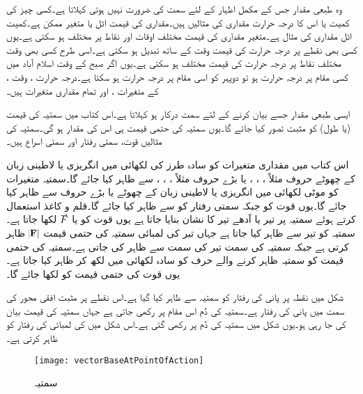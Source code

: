 وہ طبعی مقدار جس کے مکمل اظہار کے لئے سمت کی ضرورت نہیں ہوتی  کہلاتا ہے۔کسی چیز کی کمیت  یا اس کا درجہ حرارت  مقداری کی مثالیں ہیں۔مقداری کی قیمت اٹل یا متغیر ممکن ہے۔کمیت اٹل مقداری کی مثال ہے۔متغیر مقداری کی قیمت مختلف اوقات اور نقاط پر مختلف ہو سکتی ہے۔یوں کسی بھی نقطے پر درجہ حرارت کی قیمت وقت  کے ساتھ تبدیل ہو سکتی ہے۔اسی طرح کسی بھی وقت مختلف نقاط پر درجہ حرارت کی قیمت مختلف ہو سکتی ہے۔یوں اگر صبح  کے وقت اسلام آباد میں کسی مقام پر درجہ حرارت  ہو تو دوپہر کو اسی مقام پر درجہ حرارت  ہو سکتا ہے۔درجہ حرارت ، وقت ،   کے متغیرات  ،  اور  تمام مقداری متغیرات ہیں۔

ایسی طبعی مقدار جسے بیان کرنے کے لئے سمت درکار ہو  کہلاتا ہے۔اس کتاب میں سمتیہ کی قیمت (یا طول) کو مثبت تصور کیا جائے گا۔یوں سمتیہ کی حتمی قیمت ہی اس کی مقدار ہو گی۔سمتیہ کی مثالیں قوت، سمتی رفتار اور سمتی اسراع  ہیں۔

اس کتاب میں مقداری متغیرات کو سادہ طرز کی لکھائی میں انگریزی یا لاطینی زبان کے  چھوٹے حروف مثلاً ، ، ، 
  یا بڑے حروف مثلاً ، ، ،   سے ظاہر کیا جائے گا۔سمتیہ متغیرات کو موٹی لکھائی میں انگریزی یا لاطینی زبان کے  چھوٹے  یا بڑے حروف  سے ظاہر کیا جائے گا۔یوں قوت  کو  جبکہ سمتی رفتار کو  سے ظاہر کیا جائے گا۔قلم و کاغذ استعمال کرتے ہوئے سمتیہ پر تیر  یا آدھے تیر کا نشان بنایا جاتا ہے یوں قوت کو  یا  
$\overset{\rightharpoonup}{\rule{0pt}{.9ex}\smash{F}}$
لکھا جاتا ہے۔سمتیہ کو تیر سے ظاہر کیا جاتا ہے جہاں تیر کی لمبائی سمتیہ کی حتمی قیمت $\abs{\bf{F}}$  ظاہر کرتی ہے جبکہ سمتیہ کی سمت تیر کی سمت  سے ظاہر کی جاتی ہے۔سمتیہ کی حتمی قیمت کو سمتیہ ظاہر کرنے والے حرف کو سادہ لکھائی میں لکھ کر ظاہر کیا جاتا ہے۔یوں قوت   کی حتمی قیمت  کو  لکھا جائے گا۔ 

شکل  میں نقطہ  پر پانی کی رفتار کو سمتیہ  سے ظاہر کیا گیا ہے۔اس نقطے پر مثبت افقی محور کی سمت میں پانی کی رفتار  ہے۔سمتیہ کی دُم اس مقام پر رکھی جاتی ہے جہاں سمتیہ کی قیمت بیان کی جا رہی ہو۔یوں شکل میں سمتیہ کی دُم   پر رکھی گئی ہے۔اس شکل میں  کی لمبائی  کی رفتار کو ظاہر کرتی ہے۔
\begin{figure}
\centering
\texttt{[image: vectorBaseAtPointOfAction]}
\caption{سمتیہ}
\label{شکل_سمتیہ_دم_پر_عمل_درامد_ہوتی_ہے}
\end{figure}

